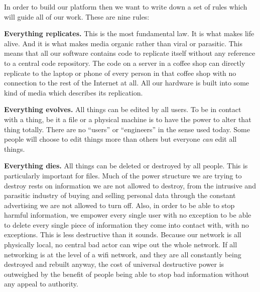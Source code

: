 In order to build our platform then we want to write down a set of rules which will guide all of our work.  These are nine rules:

\textbf{Everything replicates.} This is the most fundamental law.  It is what makes life alive.  And it is what makes media organic rather than viral or parasitic.  This means that all our software contains code to replicate itself without any reference to a central code repository.  The code on a server in a coffee shop can directly replicate to the laptop or phone of every person in that coffee shop with no connection to the rest of the Internet at all.  All our hardware is built into some kind of media which describes its replication.  

\textbf{Everything evolves.}  All things can be edited by all users.  To be in contact with a thing, be it a file or a physical machine is to have the power to alter that thing totally.  There are no ``users'' or ``engineers'' in the sense used today.  Some people will choose to edit things more than others but everyone \emph{can} edit all things.

\textbf{Everything dies.}  All things can be deleted or destroyed by all people.  This is particularly important for files.  Much of the power structure we are trying to destroy rests on information we are not allowed to destroy, from the intrusive and parasitic industry of buying and selling personal data through the constant advertising we are not allowed to turn off.  Also, in order to be able to stop harmful information, we empower every single user with no exception to be able to delete every single piece of information they come into contact with, with no exceptions. This is less destructive than it sounds. Because our network is all physically local, no central bad actor can wipe out the whole network.  If all networking is at the level of a wifi network, and they are all constantly being destroyed and rebuilt anyway, the cost of universal destructive power is outweighed by the benefit of people being able to stop bad information without any appeal to authority. 

